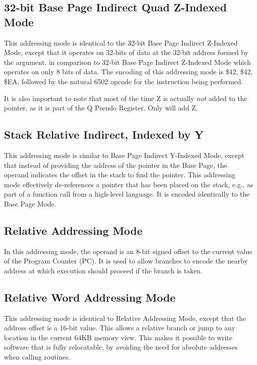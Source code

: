 
\subsection{32-bit Base Page Indirect Quad Z-Indexed Mode}

This addressing mode is identical to the 32-bit Base Page Indirect Z-Indexed Mode,
except that it operates on 32-bits of data at the 32-bit address formed by the argument,
in comparison to 32-bit Base Page Indirect Z-Indexed Mode which operates on only 8 bits
of data.   The encoding of this addressing mode is \$42, \$42, \$EA, followed by the
natural 6502 opcode for the instruction being performed.

It is also important to note that most of the time Z is actually {\em not} added to the
pointer, as it is part of the Q Pseudo Register. Only  will add Z.

\subsection{Stack Relative Indirect, Indexed by Y}

This addressing mode is similar to Base Page Indirect Y-Indexed Mode,
except that instead of providing the address of the pointer in the
Base Page, the operand indicates the offset in the stack to find the
pointer. This addressing mode effectively de-references a pointer that
has been placed on the stack, e.g., as part of a function call from a
high-level language.  It is encoded identically to the Base Page Mode.

\subsection{Relative Addressing Mode}

In this addressing mode, the operand is an 8-bit signed offset to the
current value of the Program Counter (PC). It is used to allow branches
to encode the nearby address at which execution should proceed if the
branch is taken.

\subsection{Relative Word Addressing Mode}

This addressing mode is identical to Relative Addressing Mode, except that
the address offset is a 16-bit value. This allows a relative branch or jump
to any location in the current 64KB memory view.  This makes it possible
to write software that is fully relocatable, by avoiding the need for absolute
addresses when calling routines.

